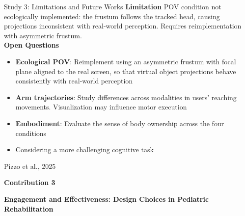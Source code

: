 \documentclass[aspectratio=169, 12pt]{beamer}
\newcommand{\citefooter}[1]{\hfill{\tiny #1}}
\begin{document}
\begin{frame}{Study 3: Limitations and Future Works}
	\textbf{\textcolor{gbAqua}{Limitation}}
	POV condition not ecologically implemented: the frustum follows the tracked head, causing projections inconsistent with real-world perception. Requires reimplementation with asymmetric frustum.
	\vspace{0.2cm}\\
	\textbf{\textcolor{gbAqua}{Open Questions}}
	\begin{itemize}
		\item \textbf{Ecological POV}: Reimplement using an asymmetric frustum with focal plane aligned to the real screen, so that virtual object projections behave consistently with real-world perception
		\item \textbf{Arm trajectories}: Study differences across modalities in users' reaching movements. Visualization may influence motor execution
		\item \textbf{Embodiment}: Evaluate the sense of body ownership across the four conditions
		\item Considering a more challenging cognitive task
	\end{itemize}
	
	\citefooter{Pizzo et al., 2025}
\end{frame}

\begin{frame}[plain]
	\vfill
	\begin{center}
		{\large \textcolor{gbAqua}{\textbf{Contribution 3}}}
		
		\vspace{0.4cm}
		
		{\LARGE \textbf{Engagement and Effectiveness: Design Choices in Pediatric Rehabilitation}}
		
	\end{center}
	\vfill
\end{frame}
\end{document}
